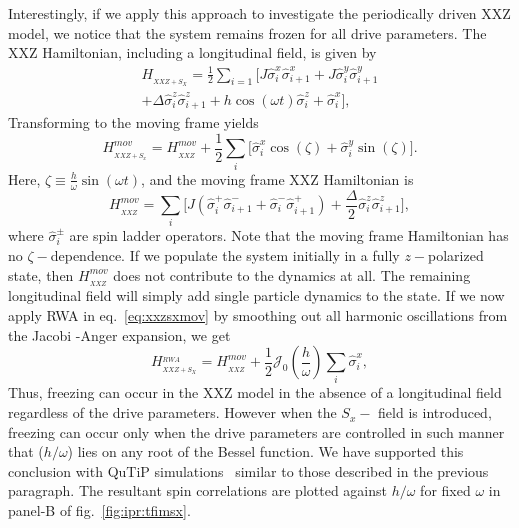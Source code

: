 \documentclass[%
reprint,
superscriptaddress,
amsmath,amssymb,
aps,
prb,
showkeys,
]{revtex4-2}
\begin{document}
Interestingly, if we apply this approach to investigate the periodically driven XXZ model, we notice that the system remains frozen for all drive parameters. The XXZ Hamiltonian, including a longitudinal field, is given by
\begin{multline}
	H_{_{XXZ+S_{X}}} = \frac12 \sum_{i=1} \bigg[ J \hat{\sigma}^x_i \hat{\sigma}^x_{i+1} +J  \hat{\sigma}^y_i \hat{\sigma}^y_{i+1}\\ + \Delta  \hat{\sigma}^z_i \hat{\sigma}^z_{i+1} + h\cos(\omega t)  \hat{\sigma}^z_i + \hat{\sigma}^x_i\bigg],
	\label{eq:xxzsx}
\end{multline}
Transforming to the moving frame  yields
\begin{equation}
H_{_{XXZ+S_{x}}}^{mov} =H_{_{XXZ}}^{mov} +  \frac12 \sum_i\Big[ \hat{\sigma}^x_i \cos(\zeta) + \hat{\sigma}^y_i \sin(\zeta)\Big].
\label{eq:xxzsxmov}
\end{equation}
Here, $\zeta \equiv \frac{h}{\omega}\sin(\omega t)$, and the moving frame XXZ Hamiltonian is
\begin{equation}
H_{_{XXZ}}^{mov} =  \sum_i\Bigg[J\left(\hat{\sigma}^+_i \hat{\sigma}^-_{i+1} + \hat{\sigma}^-_i \hat{\sigma}^+_{i+1}\right) + \frac{\Delta}{2} \hat{\sigma}^z_i \hat{\sigma}^z_{i+1}\Bigg],
\end{equation}
where $\hat{\sigma}^\pm_i$ are spin ladder operators. Note that the moving frame Hamiltonian has no $\zeta-$dependence. If we populate the system initially in a  fully $z-$polarized state, then $H_{_{XXZ}}^{mov}$ does not contribute to the dynamics at all. The remaining longitudinal field  will simply add single particle dynamics to the state. If we now apply RWA in eq.~\ref{eq:xxzsxmov} by smoothing out all harmonic oscillations from the Jacobi -Anger expansion, we get
\begin{equation}
H_{_{XXZ+S_{X}}}^{_{RWA}} = H_{_{XXZ}}^{mov} +  \frac12 \mathcal{J}_0 \left(\frac{h}{\omega}\right)\sum_i \hat{\sigma}^x_i,
\label{eq:xxz_sx_rwa}
\end{equation}
Thus, freezing can occur in the XXZ model in the absence of a longitudinal field regardless of the drive parameters. However when the $S_x-$ field is introduced, freezing can occur only when the drive parameters are controlled in such manner that ($h/\omega$) lies on any root of the Bessel function. We have supported this conclusion with QuTiP simulations~\cite{qutip} similar to those described in the previous paragraph. The resultant spin correlations are plotted against $h/\omega$ for fixed $\omega$ in panel-B of  fig.~\ref{fig:ipr:tfimsx}. 
\end{document}
